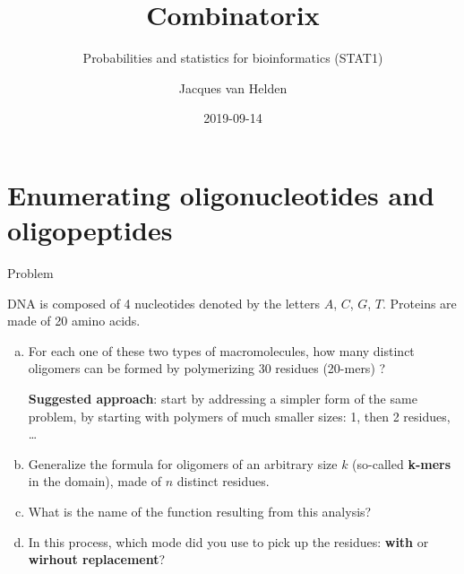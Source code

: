 \documentclass[ignorenonframetext,]{beamer}
\title{Combinatorix}
\subtitle{Probabilities and statistics for bioinformatics (STAT1)}
\author{Jacques van Helden}
\date{2019-09-14}
\begin{document}
\frame{\titlepage}

\begin{frame}
\tableofcontents[hideallsubsections]
\end{frame}
\hypertarget{enumerating-oligonucleotides-and-oligopeptides}{%
\section{Enumerating oligonucleotides and
oligopeptides}\label{enumerating-oligonucleotides-and-oligopeptides}}

\begin{frame}{Problem}
\protect\hypertarget{problem}{}

DNA is composed of 4 nucleotides denoted by the letters \(A\), \(C\),
\(G\), \(T\). Proteins are made of 20 amino acids.

\begin{enumerate}
[a.]
\item
  For each one of these two types of macromolecules, how many distinct
  oligomers can be formed by polymerizing 30 residues (20-mers) ?

  \textbf{Suggested approach}: start by addressing a simpler form of the
  same problem, by starting with polymers of much smaller sizes: 1, then
  2 residues, \ldots{}
\item
  Generalize the formula for oligomers of an arbitrary size \(k\)
  (so-called \textbf{k-mers} in the domain), made of \(n\) distinct
  residues.
\item
  What is the name of the function resulting from this analysis?
\item
  In this process, which mode did you use to pick up the residues:
  \textbf{with} or \textbf{wirhout replacement}?
\end{enumerate}

\end{frame}
\end{document}
